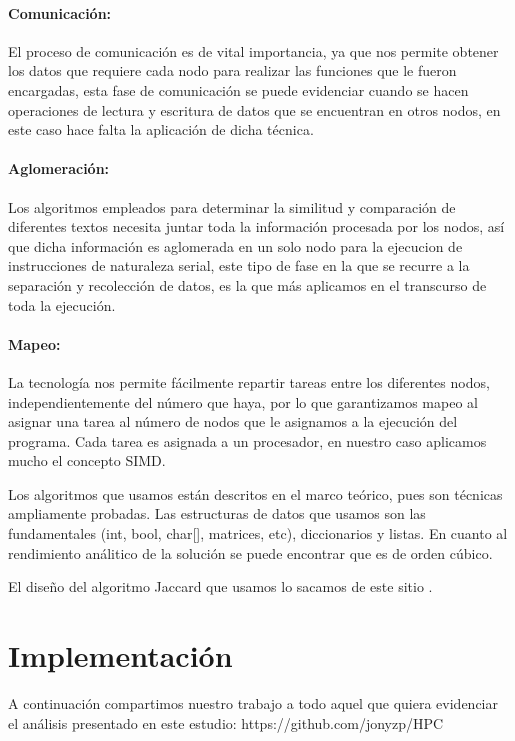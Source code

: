 \documentclass[fleqn,10pt]{SelfArx} %
\begin{document}
\paragraph{Comunicación:}
El proceso de comunicación es de vital importancia, ya que nos permite obtener los datos que requiere cada nodo para realizar las funciones que le fueron encargadas, esta fase de comunicación se puede evidenciar cuando se hacen operaciones de lectura y escritura de datos que se encuentran en otros nodos, en este caso hace falta la aplicación de dicha técnica.


\paragraph{Aglomeración:}
Los algoritmos empleados para determinar la similitud y comparación de diferentes textos necesita juntar toda la información procesada por los nodos, así que dicha información es aglomerada en un solo nodo para la ejecucion de instrucciones de naturaleza serial, este tipo de fase en la que se recurre a la separación y recolección de datos, es la que más aplicamos en el transcurso de toda la ejecución.

\paragraph{Mapeo:}
La tecnología nos permite fácilmente repartir tareas entre los diferentes nodos, independientemente del número que haya, por lo que garantizamos mapeo al asignar una tarea al número de nodos que le asignamos a la ejecución del programa. Cada tarea es asignada a un procesador, en nuestro caso aplicamos mucho el concepto SIMD.

Los algoritmos que usamos están descritos en el marco teórico, pues son técnicas ampliamente probadas.
Las estructuras de datos que usamos son las fundamentales (int, bool, char[], matrices, etc), diccionarios y listas.
En cuanto al rendimiento análitico de la solución se puede encontrar que es de orden cúbico.

El diseño del algoritmo Jaccard que usamos lo sacamos de este sitio \cite{jaccard_seudo}. 

\section{Implementación}

A continuación compartimos nuestro trabajo a todo aquel que quiera evidenciar el análisis presentado en este estudio: https://github.com/jonyzp/HPC
\end{document}
